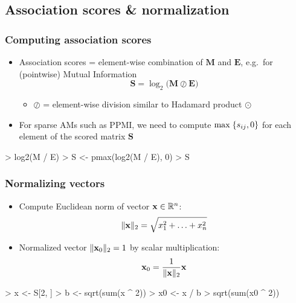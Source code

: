 \documentclass[t]{beamer} %
\begin{document}
\subsection{Association scores \& normalization}

\begin{frame}[fragile]
  \frametitle{Computing association scores}
  
  \begin{itemize}
  \item Association scores = element-wise combination of $\mathbf{M}$ and $\mathbf{E}$, e.g.\ for (pointwise) Mutual Information
    \[
    \mathbf{S} = \log_2 \bigl( \mathbf{M} \oslash \mathbf{E} \bigr)
    \]
    \begin{itemize}\ungap[1]
    \item $\oslash$ = element-wise division similar to Hadamard product $\odot$
    \end{itemize}
  \item<2-> For sparse AMs such as PPMI, we need to compute $\max\; \set{s_{ij}, 0}$ for each element of the scored matrix $\mathbf{S}$
  \end{itemize}
  
\gap[1]
\begin{Rcode}
> log2(M / E)
> S <- pmax(log2(M / E), 0) 
> S    
\end{Rcode}
\end{frame}

\begin{frame}[fragile]
  \frametitle{Normalizing vectors}
  
  \begin{itemize}
  \item Compute Euclidean norm of vector $\mathbf{x}\in \setR^n$:
    \[
    \norm[2]{\mathbf{x}} = \sqrt{x_1^2 + \ldots + x_n^2}
    \]
  \item<2-> Normalized vector $\norm[2]{\mathbf{x}_0} = 1$ by scalar multiplication:
    \[
    \mathbf{x}_0 = \frac{1}{\norm[2]{\mathbf{x}}} \mathbf{x}
    \]
  \end{itemize}

\ungap[1]  
\begin{Rcode}
> x <- S[2, ]
> b <- sqrt(sum(x ^ 2)) 
> x0 <- x / b           
> sqrt(sum(x0 ^ 2))  
\end{Rcode}
\end{frame}
\end{document}
